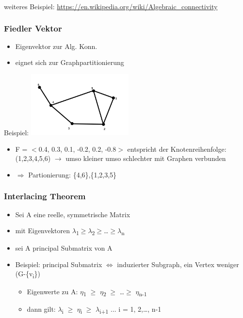 weiteres Beispiel: \url{https://en.wikipedia.org/wiki/Algebraic_connectivity}

\newpage

\subsubsection{Fiedler Vektor}
\begin{itemize}
	\item Eigenvektor zur Alg. Konn.
	\item eignet sich zur Graphpartitionierung
\end{itemize}

Beispiel:
\includegraphics[width=0.4\textwidth]{lectures/161028/pix/fiedler.png}
\begin{itemize}
	\item F = $<$0.4, 0.3, 0.1, -0.2, 0.2, -0.8$>$ entspricht der Knotenreihenfolge: (1,2,3,4,5,6) $\rightarrow$ umso kleiner umso schlechter mit Graphen verbunden
	\item $\Rightarrow$ Partionierung: \{4,6\},\{1,2,3,5\}\newline
\end{itemize}

\subsubsection{Interlacing Theorem}
\begin{itemize}
	\item Sei A eine reelle, symmetrische Matrix
	\item mit Eigenvektoren $\lambda$\textsubscript{1}$\geq$$\lambda$\textsubscript{2}$\geq$\ldots$\geq$$\lambda$\textsubscript{n}
	\item sei A\grq{} principal Submatrix von A
	\item Beispiel: principal Submatrix $\Leftrightarrow$ induzierter Subgraph, ein Vertex weniger (G-\{v\textsubscript{i}\})
	\begin{itemize}
		\item Eigenwerte zu A\grq{}: $\eta$\textsubscript{1} $\geq$ $\eta$\textsubscript{2} $\geq$ \ldots $\geq$ $\eta$\textsubscript{n-1}
		\item dann gilt: $\lambda$\textsubscript{i} $\geq$ $\eta$\textsubscript{i} $\geq$ $\lambda$\textsubscript{i+1} ... i = 1, 2,\ldots, n-1
	\end{itemize}
\end{itemize}

